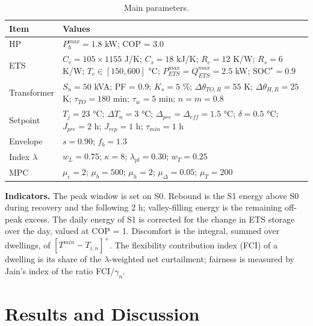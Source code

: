 \documentclass[conference]{IEEEtran}
\begin{document}
\begin{table}[tb]
\centering\footnotesize
\caption{Main parameters.}\label{tab:IV}
\begin{tabular}{>{\raggedright\arraybackslash}p{}>{\raggedright\arraybackslash}p{}}
\toprule
\textbf{Item} & \textbf{Values} \\
\midrule
HP & \(P^{max}_h=1.8\) kW; COP = 3.0 \\
ETS & \(C_c=105\times1155\) J/K; \(C_s=18\) kJ/K; \(R_c=12\) K/W; \(R_s=6\) K/W; \(T_c\in[150,600]\) °C; \(P^{max}_{ETS}=Q^{max}_{ETS}=2.5\) kW; \(\mathrm{SOC}^\star=0.9\) \\
Transformer & \(S_n=50\) kVA; PF = 0.9; \(K_s=5\) \%; \(\Delta\theta_{TO,R}=55\) K; \(\Delta\theta_{H,R}=25\) K; \(\tau_{TO}=180\) min; \(\tau_w=5\) min; \(n=m=0.8\) \\
Setpoint & \(T_j=23\) °C; \(\Delta T_n=3\) °C; \(\Delta_{pre}=\Delta_{eff}=1.5\) °C; \(\delta=0.5\) °C; \(J_{pre}=2\) h; \(J_{rep}=1\) h; \(\tau_{min}=1\) h \\
Envelope & \(s=0.90\); \(f_b=1.3\) \\
Index \(\lambda\) & \(w_L=0.75\); \(\kappa=8\); \(\lambda_{pl}=0.30\); \(w_T=0.25\) \\
MPC & \(\mu_c=2\); \(\mu_b=500\); \(\mu_h=2\); \(\mu_\Delta=0.05\); \(\mu_T=200\) \\
\bottomrule
\end{tabular}
\end{table}

\textbf{Indicators.} The peak window is set on S0. Rebound is the S1 energy above S0 during recovery and the following 2 h; valley-filling energy is the remaining off-peak excess. The daily energy of S1 is corrected for the change in ETS storage over the day, valued at COP = 1. Discomfort is the integral, summed over dwellings, of \([T^{min}-T_{i,n}]^+\). The flexibility contribution index (FCI) of a dwelling is its share of the \(\lambda\)-weighted net curtailment; fairness is measured by Jain's index \cite{Jain1984} of the ratio FCI\(/\gamma_n\).

\section{\textbf{Results and Discussion}}
\end{document}
